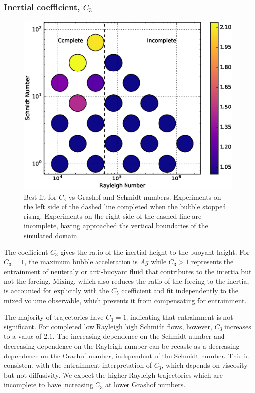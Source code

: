 \subsubsection{Inertial coefficient, $C_3$}
\begin{figure}
\includegraphics[width=\columnwidth]{figs/C3-vs-Rayleigh-Schmidt}
\caption{ 
  Best fit for $C_3$ vs Grashof and Schmidt numbers.
  Experiments on the left side of the dashed line completed when the bubble stopped rising.
  Experiments on the right side of the dashed line are incomplete, having approached the vertical boundaries of the simulated domain.
}
\end{figure}

The coefficient $C_3$ gives the ratio of the inertial height to the buoyant height.
For $C_3 = 1$, the maximum bubble acceleration is $A g$ while $C_3 > 1$ represents the entrainment of neuteraly or anti-buoyant fluid that contributes to the intertia but not the forcing.
Mixing, which also reduces the ratio of the forcing to the inertia, is accounted for explicitly with the $C_5$ coefficient and fit independently to the mixed volume observable, which prevents it from compensating for entrainment.

The majority of trajectories have $C_3 = 1$, indicating that entrainment is not significant.
For completed low Rayleigh high Schmidt flows, however, $C_3$ increases to a value of $2.1$.
The increasing dependence on the Schmidt number and decreasing dependence on the Rayleigh number can be recaste as a decreasing dependence on the Grashof number, independent of the Schmidt number.
This is consistent with the entrainment interpretation of $C_3$, which depends on viscosity but not diffusivity.
We expect the higher Rayleigh trajectories which are incomplete to have increasing $C_3$ at lower Grashof numbers.

